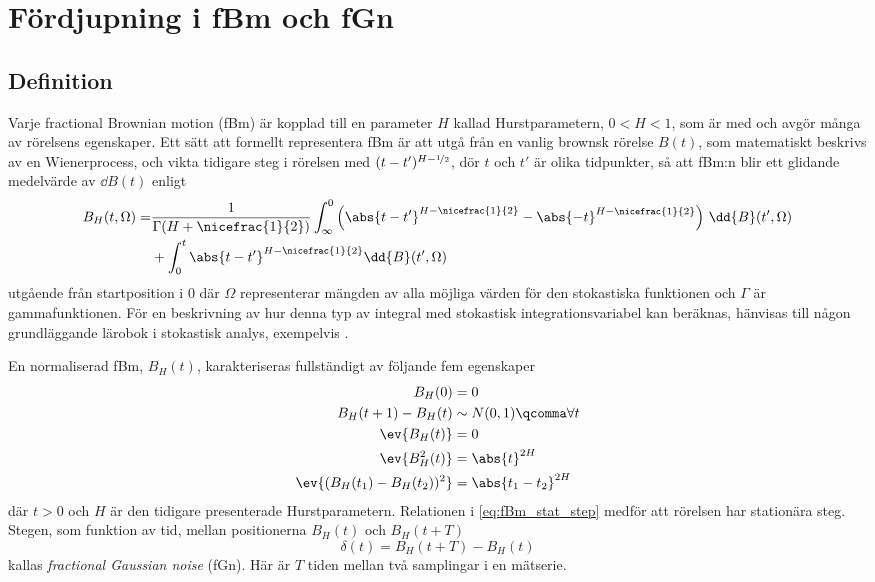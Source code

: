\chapter{Fördjupning i fBm och fGn}
\label{sec:App_fBm}


\section{Definition}

Varje fractional Brownian motion (fBm) är kopplad till en parameter $H$ kallad Hurstparametern, $0<H<1$, som är med och avgör många av rörelsens egenskaper. Ett sätt att formellt representera fBm är att utgå från en vanlig brownsk rörelse $B(t)$, som matematiskt beskrivs av en Wienerprocess, och vikta tidigare steg i rörelsen med $(t-t')^{H-\nicefrac{1}{2}}$, dör $t$ och $t'$ är olika tidpunkter, så att fBm:n blir ett glidande medelvärde av $\dd{B}(t)$ enligt \cite{Mandelbrot_fBm1968}
\begin{equation} \label{eq:fBm_repr}
\begin{aligned}
    B_H(t,\Omega)=& \frac{1}{\Gamma(H+\nicefrac{1}{2})}
    \int_{\infty}^0 \left( \abs{t-t'}^{H-\nicefrac{1}{2}}-\abs{-t}^{H-\nicefrac{1}{2}}\right)\,\dd{B}(t',\Omega) \\
    &+ \int_0^t \abs{t-t'}^{H-\nicefrac{1}{2}} \dd{B}(t',\Omega)
\end{aligned}
\end{equation}
utgående från startposition i 0 där $\Omega$ representerar mängden av alla möjliga värden för den stokastiska funktionen och $\Gamma$ är gammafunktionen. För en beskrivning av hur denna typ av integral med stokastisk integrationsvariabel kan beräknas, hänvisas till någon grundläggande lärobok i stokastisk analys, exempelvis \cite{Oksendal2002}.


En normaliserad fBm, $B_H(t)$, karakteriseras fullständigt av följande fem egenskaper~\cite{Dieker_fBm}
\begin{subequations}
\begin{align} 
    B_H(0)&=0 \\ 
    B_H(t+1)-B_H(t) &\sim N(0,1)\qcomma \forall t \label{eq:fBm_normstep}\\
    \ev{B_H(t)}&=0 \label{eq:fBm_mean} \\
    \ev{B^2_H(t)}&=\abs{t}^{2H} \label{eq:fBm_var}\\
    \ev{(B_H(t_1)-B_H(t_2))^2}&=\abs{t_1-t_2}^{2H}  \label{eq:fBm_stat_step}
\end{align}
\end{subequations}
där $t>0$ och $H$ är den tidigare presenterade Hurstparametern.  Relationen i \eqref{eq:fBm_stat_step} medför att rörelsen har stationära steg. Stegen, som funktion av tid, mellan positionerna $B_H(t)$ och $B_H(t+T)$
\begin{equation} \label{eq:fracGauss}
    \delta(t) = B_H(t+T) - B_H(t)
\end{equation}
kallas \emph{fractional Gaussian noise} (fGn). Här är $T$ tiden mellan två samplingar i en mätserie. 

